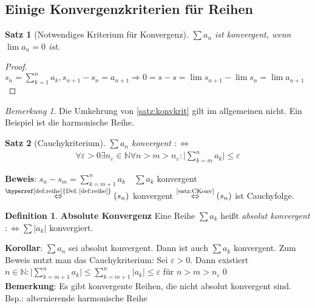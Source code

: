 \documentclass[ngerman,titlepage,twoside, parskip=half*]{scrreprt}
\newcommand*{\N}{\mathbb{N}}
\newcommand*{\perdef}{:\Leftrightarrow}
\theoremstyle{plain}
\newtheorem{theorem}{Satz}[section]
\theoremstyle{definition}
\newtheorem{definition}{Definition}
\theoremstyle{remark}
\newtheorem*{remark}{Bemerkung}
\newcommand*{\abs}[2][]{#1\lvert#2#1\rvert}
\begin{document}
\subsection{Einige Konvergenzkriterien für Reihen}

\begin{theorem}[Notwendiges Kriterium für
  Konvergenz]
\label{satz:konvkrit}
$\sum a_n$ ist konvergent, wenn  $\lim a_n=0$ ist.
\end{theorem}
\begin{proof}
  $s_n=\sum_{k=1}^n a_k, s_{n+1}-s_n=a_{n+1} \Rightarrow
  0=s-s=\lim s_{n+1}-\lim s_n=\lim a_{n+1}$
\end{proof}

\begin{remark}
  Die Umkehrung von \autoref{satz:konvkrit} gilt im allgemeinen
  nicht. Ein Beispiel ist die harmonische Reihe.
\end{remark}

\begin{theorem}[Cauchykriterium]
\label{satz:CKrit}
 $\sum a_n$ konvergent $\perdef$
\begin{gather*}\forall \varepsilon >0 \exists n_{\varepsilon}\in \N \forall n>m>n_{\varepsilon}\colon\abs{\sum_{k=m}^n a_k}
\leq \varepsilon\end{gather*}
\end{theorem}
\textbf{Beweis}: $s_n-s_m=\sum_{k=m+1}^n a_k\quad \sum a_k$ konvergent
$\stackrel{\text{\hyperref[def:reihe]{Def.\,\ref*{def:reihe}}}}{\Leftrightarrow}
(s_n)$ konvergent $\stackrel{\text{\autoref{satz:CKonv}}}{\Leftrightarrow}(s_n)$ ist Cauchyfolge.

\begin{definition}
\textbf{Absolute Konvergenz} Eine Reihe $\sum a_k$ heißt \emph{absolut konvergent}
$\perdef \sum \abs{a_k}$ konvergiert.
\end{definition}

\textbf{Korollar}: $\sum a_n$ sei absolut konvergent. Dann ist auch $\sum a_k$ konvergent.
Zum Beweis nutzt man das Cauchykriterium: Sei $\varepsilon >0$. Dann existiert $n\in \N \colon \abs{\sum_{k=m+1}^n a_k}\leq 
\sum_{k=m+1}^n \abs{a_k}\leq \varepsilon$ für $n>m>n_{\varepsilon}$\qed\\
\textbf{Bemerkung}: Es gibt konvergente Reihen, die nicht absolut konvergent sind. Bsp.: al\-ter\-nie\-rende harmonische
Reihe
\end{document}
